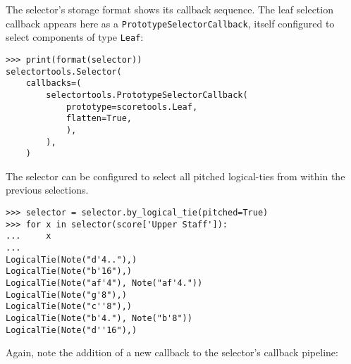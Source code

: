 \noindent The selector's storage format shows its callback sequence. The leaf
selection callback appears here as a \texttt{PrototypeSelectorCallback}, itself
configured to select components of type \texttt{Leaf}:

\begin{comment}
<abjad>
print(format(selector))
</abjad>
\end{comment}

\begin{abjadbookoutput}
\begin{singlespacing}
\vspace{-0.5\baselineskip}
\begin{verbatim}
>>> print(format(selector))
selectortools.Selector(
    callbacks=(
        selectortools.PrototypeSelectorCallback(
            prototype=scoretools.Leaf,
            flatten=True,
            ),
        ),
    )
\end{verbatim}
\end{singlespacing}
\end{abjadbookoutput}

\noindent The selector can be configured to select all pitched logical-ties
from within the previous selections.

\begin{comment}
<abjad>
selector = selector.by_logical_tie(pitched=True)
for x in selector(score['Upper Staff']):
    x

</abjad>
\end{comment}

\begin{abjadbookoutput}
\begin{singlespacing}
\vspace{-0.5\baselineskip}
\begin{verbatim}
>>> selector = selector.by_logical_tie(pitched=True)
>>> for x in selector(score['Upper Staff']):
...     x
...
LogicalTie(Note("d'4.."),)
LogicalTie(Note("b'16"),)
LogicalTie(Note("af'4"), Note("af'4."))
LogicalTie(Note("g'8"),)
LogicalTie(Note("c''8"),)
LogicalTie(Note("b'4."), Note("b'8"))
LogicalTie(Note("d''16"),)
\end{verbatim}
\end{singlespacing}
\end{abjadbookoutput}

\noindent Again, note the addition of a new callback to the selector's callback
pipeline:

\begin{comment}
<abjad>
print(format(selector))
</abjad>
\end{comment}

